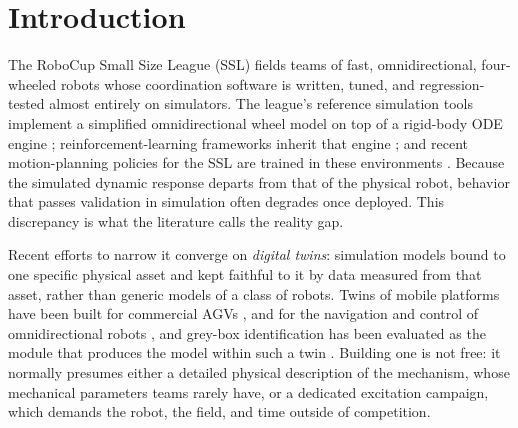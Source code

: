 \section{Introduction}
\label{sec:intro}

The RoboCup Small Size League (SSL) fields teams of fast, omnidirectional, four-wheeled robots whose coordination software is written, tuned, and regression-tested almost entirely on simulators. The league's reference simulation tools implement a simplified omnidirectional wheel model on top of a rigid-body ODE engine \cite{monajjemi2012grsim}; reinforcement-learning frameworks inherit that engine \cite{martins2021rsoccer}; and recent motion-planning policies for the SSL are trained in these environments \cite{machado2025planning}. Because the simulated dynamic response departs from that of the physical robot, behavior that passes validation in simulation often degrades once deployed. This discrepancy is what the literature calls the reality gap.

Recent efforts to narrow it converge on \emph{digital twins}: simulation models bound to one specific  physical asset and kept faithful to it by data measured from that asset, rather than generic models of a class of robots. Twins of mobile platforms have been built for commercial AGVs \cite{barioni2024development}, and for the navigation and control of omnidirectional robots \cite{yang2025digital}, and grey-box identification has been evaluated as the module that produces the model within such a twin \cite{brennan2025greybox}. Building one is not free: it normally presumes either a detailed physical description of the mechanism, whose mechanical parameters teams rarely have, or
a dedicated excitation campaign, which demands the robot, the field, and time outside of competition.

